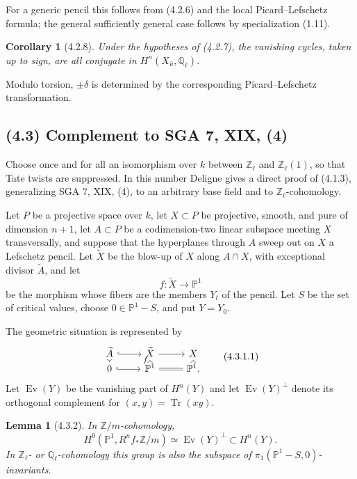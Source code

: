 \documentclass[11pt]{article}
\newtheorem{lemma}{Lemma}
\newtheorem{corollary}{Corollary}
\theoremstyle{remark}
\begin{document}
For a generic pencil this follows from (4.2.6) and the local Picard--Lefschetz formula; the general sufficiently general case follows by specialization (1.11).

\begin{corollary}[4.2.8]
Under the hypotheses of (4.2.7), the vanishing cycles, taken up to sign, are all conjugate in $H^n(X_{\bar u},\mathbb Q_\ell)$.
\end{corollary}

Modulo torsion, $\pm\delta$ is determined by the corresponding Picard--Lefschetz transformation.

\subsection*{(4.3) Complement to SGA 7, XIX, (4)}

Choose once and for all an isomorphism over $k$ between $\mathbb Z_\ell$ and $\mathbb Z_\ell(1)$, so that Tate twists are suppressed. In this number Deligne gives a direct proof of (4.1.3), generalizing SGA 7, XIX, (4), to an arbitrary base field and to $\mathbb Z_\ell$-cohomology.

Let $P$ be a projective space over $k$, let $X\subset P$ be projective, smooth, and pure of dimension $n+1$, let $A\subset P$ be a codimension-two linear subspace meeting $X$ transversally, and suppose that the hyperplanes through $A$ sweep out on $X$ a Lefschetz pencil. Let $\widetilde X$ be the blow-up of $X$ along $A\cap X$, with exceptional divisor $\widetilde A$, and let
\[
 f:\widetilde X\longrightarrow \mathbb P^1
\]
be the morphism whose fibers are the members $Y_t$ of the pencil. Let $S$ be the set of critical values, choose $0\in\mathbb P^1-S$, and put $Y=Y_0$.

The geometric situation is represented by
\[
\begin{tikzcd}
\widetilde A \arrow[r,hook] \arrow[d] & \widetilde X \arrow[r] \arrow[d,"f"] & X\arrow[d]\cr
0 \arrow[r,hook] & \mathbb P^1 \arrow[r,equal] & \mathbb P^1 .
\end{tikzcd}
\tag{4.3.1.1}
\]
Let $\operatorname{Ev}(Y)$ be the vanishing part of $H^n(Y)$ and let $\operatorname{Ev}(Y)^{\perp}$ denote its orthogonal complement for $(x,y)=\operatorname{Tr}(xy)$.

\begin{lemma}[4.3.2]
In $\mathbb Z/m$-cohomology,
\[
H^0(\mathbb P^1,R^n f_*\mathbb Z/m)\simeq \operatorname{Ev}(Y)^{\perp}\subset H^n(Y).
\]
In $\mathbb Z_\ell$- or $\mathbb Q_\ell$-cohomology this group is also the subspace of $\pi_1(\mathbb P^1-S,0)$-invariants.
\end{lemma}
\end{document}
